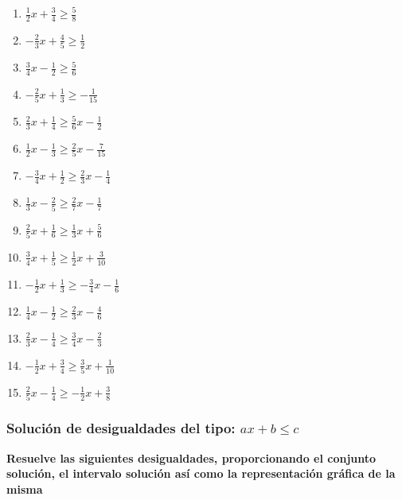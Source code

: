 \documentclass[12pt]{article}
\begin{document}
\begin{enumerate}
\def\labelenumi{\arabic{enumi}.}
\item
  \(\frac{1}{2}x + \frac{3}{4} \geq \frac{5}{8}\)
\item
  \(-\frac{2}{3}x + \frac{4}{5} \geq \frac{1}{2}\)
\item
  \(\frac{3}{4}x - \frac{1}{2} \geq \frac{5}{6}\)
\item
  \(-\frac{2}{5}x + \frac{1}{3} \geq -\frac{1}{15}\)
\item
  \(\frac{2}{3}x + \frac{1}{4} \geq \frac{5}{6}x - \frac{1}{2}\)
\item
  \(\frac{1}{2}x - \frac{1}{3} \geq \frac{2}{5}x - \frac{7}{15}\)
\item
  \(-\frac{3}{4}x + \frac{1}{2} \geq \frac{2}{3}x - \frac{1}{4}\)
\item
  \(\frac{1}{3}x - \frac{2}{5} \geq \frac{2}{7}x - \frac{1}{7}\)
\item
  \(\frac{2}{5}x + \frac{1}{6} \geq \frac{1}{3}x + \frac{5}{6}\)
\item
  \(\frac{3}{4}x + \frac{1}{5} \geq \frac{1}{2}x + \frac{3}{10}\)
\item
  \(-\frac{1}{2}x + \frac{1}{3} \geq -\frac{3}{4}x - \frac{1}{6}\)
\item
  \(\frac{1}{4}x - \frac{1}{2} \geq \frac{2}{3}x - \frac{4}{6}\)
\item
  \(\frac{2}{3}x - \frac{1}{4} \geq \frac{3}{4}x - \frac{2}{3}\)
\item
  \(-\frac{1}{2}x + \frac{3}{4} \geq \frac{3}{5}x + \frac{1}{10}\)
\item
  \(\frac{2}{5}x - \frac{1}{4} \geq -\frac{1}{2}x + \frac{3}{8}\)
\end{enumerate}

\subsubsection{\texorpdfstring{Solución de desigualdades del tipo:
\(ax+b \leq c\)}{Solución de desigualdades del tipo: ax+b \textbackslash leq c}}\label{soluciuxf3n-de-desigualdades-del-tipo-axb-leq-c}

\textbf{Resuelve las siguientes desigualdades, proporcionando el
conjunto solución, el intervalo solución así como la representación
gráfica de la misma}
\end{document}
